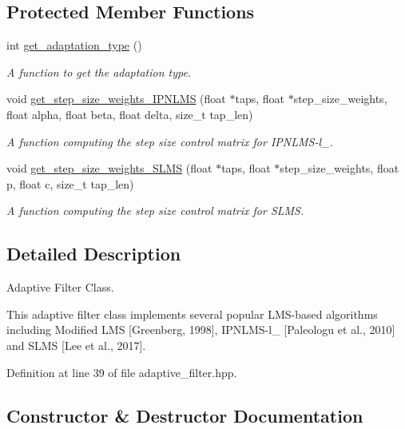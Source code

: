 \subsection*{Protected Member Functions}
\begin{DoxyCompactItemize}
\item 
int \hyperlink{classadaptive__filter_a5af026a803d8a024517df441304bd3e1}{get\+\_\+adaptation\+\_\+type} ()
\begin{DoxyCompactList}\small\item\em A function to get the adaptation type. \end{DoxyCompactList}\item 
void \hyperlink{classadaptive__filter_a0c14c1714918be7026d674a44969c54e}{get\+\_\+step\+\_\+size\+\_\+weights\+\_\+\+I\+P\+N\+L\+MS} (float $\ast$taps, float $\ast$step\+\_\+size\+\_\+weights, float alpha, float beta, float delta, size\+\_\+t tap\+\_\+len)
\begin{DoxyCompactList}\small\item\em A function computing the step size control matrix for I\+P\+N\+L\+M\+S-\/l\+\_. \end{DoxyCompactList}\item 
void \hyperlink{classadaptive__filter_a288240ca64185c37f2e05e9ac0e812c2}{get\+\_\+step\+\_\+size\+\_\+weights\+\_\+\+S\+L\+MS} (float $\ast$taps, float $\ast$step\+\_\+size\+\_\+weights, float p, float c, size\+\_\+t tap\+\_\+len)
\begin{DoxyCompactList}\small\item\em A function computing the step size control matrix for S\+L\+MS. \end{DoxyCompactList}\end{DoxyCompactItemize}


\subsection{Detailed Description}
Adaptive Filter Class. 

This adaptive filter class implements several popular L\+M\+S-\/based algorithms including Modified L\+MS \mbox{[}Greenberg, 1998\mbox{]}, I\+P\+N\+L\+M\+S-\/l\+\_ \mbox{[}Paleologu et al., 2010\mbox{]} and S\+L\+MS \mbox{[}Lee et al., 2017\mbox{]}. 

Definition at line 39 of file adaptive\+\_\+filter.\+hpp.



\subsection{Constructor \& Destructor Documentation}
\mbox{\label{classadaptive__filter_aacabbb2b73093c5a2e570060cff8c5c4}} 
